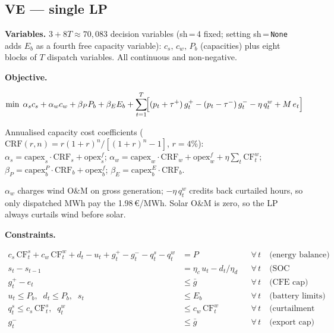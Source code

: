 \documentclass[10.5pt]{article}
\begin{document}
\subsection*{VE — single LP}

\textbf{Variables.} $3 + 8T \approx 70{,}083$ decision variables (sh\,=\,4 fixed;
setting sh\,=\,\texttt{None} adds $E_b$ as a fourth free capacity variable):
$c_s,\,c_w,\,P_b$ (capacities) plus eight blocks of $T$ dispatch variables.
All continuous and non-negative.

\textbf{Objective.}

\begin{equation}
\min \;
  \alpha_s c_s + \alpha_w c_w + \beta_P P_b + \beta_E E_b
  + \sum_{t=1}^{T}
  \!\Bigl[
    (p_t + \tau^+)\,g^+_t
    - (p_t - \tau^-)\,g^-_t
    - \eta\,q^w_t
    + M\,e_t
  \Bigr]
\label{eq:ve_obj}
\end{equation}

Annualised capacity cost coefficients ($\text{CRF}(r,n)=r(1+r)^n/[(1+r)^n-1]$, $r=4\%$):
$\alpha_s = \text{capex}_s\cdot\text{CRF}_s + \text{opex}^f_s$;\;
$\alpha_w = \text{capex}_w\cdot\text{CRF}_w + \text{opex}^f_w + \eta\sum_t\text{CF}^w_t$;\;
$\beta_P = \text{capex}^P_b\cdot\text{CRF}_b + \text{opex}^f_b$;\;
$\beta_E = \text{capex}^E_b\cdot\text{CRF}_b$.

$\alpha_w$ charges wind O\&M on gross generation; $-\eta\,q^w_t$ credits back curtailed
hours, so only dispatched MWh pay the 1.98\,€/MWh. Solar O\&M is zero, so the LP
always curtails wind before solar.

\textbf{Constraints.}

\begin{align}
  c_s\,\text{CF}^s_t + c_w\,\text{CF}^w_t
    + d_t - u_t + g^+_t - g^-_t - q^s_t - q^w_t &= P
  && \forall\,t \quad\text{(energy balance)} \label{eq:bal}\\[2pt]
  s_t - s_{t-1} &= \eta_c\,u_t - d_t/\eta_d
  && \forall\,t \quad\text{(SOC recurrence)} \label{eq:soc}\\[2pt]
  g^+_t - e_t &\leq \bar{g}
  && \forall\,t \quad\text{(CFE cap)} \label{eq:cfe}\\[2pt]
  u_t \leq P_b,\;\; d_t \leq P_b,\;\; s_t &\leq E_b
  && \forall\,t \quad\text{(battery limits)} \label{eq:batt}\\[2pt]
  q^s_t \leq c_s\,\text{CF}^s_t,\;\; q^w_t &\leq c_w\,\text{CF}^w_t
  && \forall\,t \quad\text{(curtailment limits)} \label{eq:curt}\\[2pt]
  g^-_t &\leq \bar{g}
  && \forall\,t \quad\text{(export cap)}
\end{align}
\end{document}
